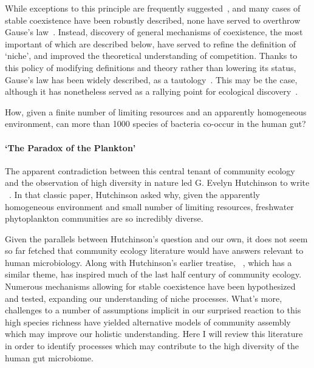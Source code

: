 \documentclass[12pt]{article}
\begin{document}
While exceptions to this principle are frequently
suggested~\citep{Koch1974a,Koch1974b},
and many cases of stable coexistence have been robustly described,
none have served to overthrow Gause's law~\citep{Hutchinson1957}.
Instead, discovery of general mechanisms of coexistence, the
most important of which are described below, have served
to refine the definition of `niche', and improved the theoretical
understanding of competition.
Thanks to this policy of modifying definitions and theory
rather than lowering its status, Gause's law has been widely described,
as a tautology~\citep{Hutchinson1961,Slobodkin1961}.
This may be the case, although it has nonetheless served as a
rallying point for ecological discovery~\citep{Armstrong1980}.

How, given a finite number of limiting resources and an apparently
homogeneous environment, can more than 1000 species of bacteria
co-occur in the human gut?

\paragraph{`The Paradox of the Plankton'}
The apparent contradiction between this central tenant
of community ecology
and the observation of high diversity in nature led
G. Evelyn Hutchinson to write
~\citeyearpar{Hutchinson1961}.
In that classic paper, Hutchinson asked why,
given the apparently homogeneous environment
and small number of limiting resources,
freshwater phytoplankton communities are so incredibly diverse.

Given the parallels between Hutchinson's question and our own,
it does not seem so far fetched that community ecology literature would have
answers relevant to human microbiology.
Along with Hutchinson's earlier treatise,
~\citeyearpar{Hutchinson1959},
which has a similar theme,
 has inspired much of the
last half century of community ecology.
Numerous mechanisms allowing for stable coexistence have been
hypothesized and tested, expanding our understanding of niche
processes.
What's more, challenges to a number of assumptions implicit in our
surprised reaction to this high species richness
have yielded alternative models of community assembly
which may improve our holistic understanding.
Here I will review this literature in order to identify processes which may
contribute to the high diversity of the human gut microbiome.
\end{document}
